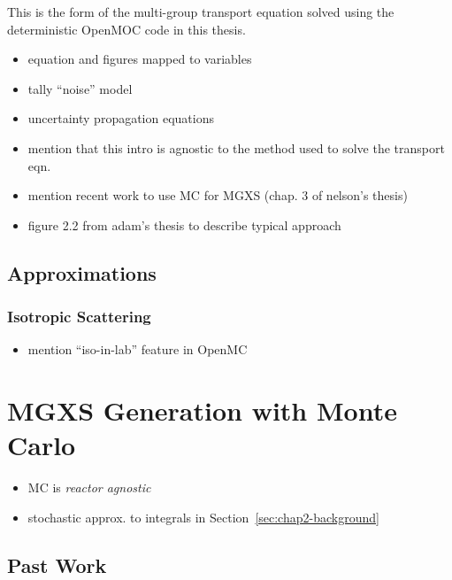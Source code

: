 This is the form of the multi-group transport equation solved using the deterministic OpenMOC code in this thesis. 


\begin{itemize}[noitemsep]
  \item equation and figures mapped to variables
  \item tally ``noise'' model
  \item uncertainty propagation equations
  \item mention that this intro is agnostic to the method used to solve the transport eqn.
   \item mention recent work to use MC for MGXS (chap. 3 of nelson's thesis)
   \item figure 2.2 from adam's thesis to describe typical approach
\end{itemize}


\subsection{Approximations}
\label{subsec:chap2-approx}

\subsubsection{Isotropic Scattering}
\label{subsubsec:chap2-iso-scatter}

\begin{itemize}
  \item mention ``iso-in-lab'' feature in OpenMC
\end{itemize}


\section{MGXS Generation with Monte Carlo}
\label{sec:chap2-mgxs-mc}

\begin{itemize}[noitemsep]
  \item \ac{MC} is \emph{reactor agnostic}
  \item stochastic approx. to integrals in Section~\ref{sec:chap2-background}
\end{itemize}

\subsection{Past Work}
\label{subsec:chap2-past-work}

